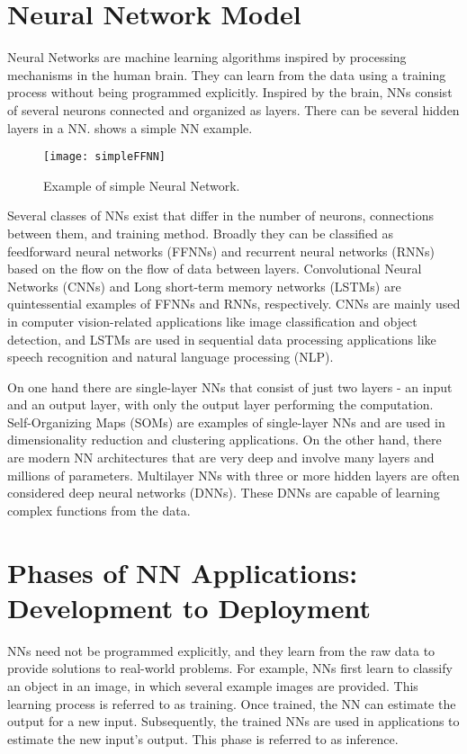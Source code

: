 \section{Neural Network Model}
Neural Networks are machine learning algorithms inspired by processing mechanisms in the human brain. They can learn from the data using a training process without being programmed explicitly. Inspired by the brain, NNs consist of several neurons connected and organized as layers. There can be several hidden layers in a NN.  shows a simple NN example. 
\begin{figure}[!htb]
	\centering
	\captionsetup{font=sf}
	\texttt{[image: simpleFFNN]}
	\caption{Example of simple Neural Network.}
	\label{fig:simpleNN}
\end{figure}

Several classes of NNs exist that differ in the number of neurons, connections between them, and training method. Broadly they can be classified as feedforward neural networks (FFNNs) and recurrent neural networks (RNNs) based on the flow on the flow of data between layers. Convolutional Neural Networks (CNNs) and Long short-term memory networks (LSTMs) are quintessential examples of FFNNs and RNNs, respectively. CNNs are mainly used in computer vision-related applications like image classification and object detection, and LSTMs are used in sequential data processing applications like speech recognition and natural language processing (NLP). 

On one hand there are single-layer NNs that consist of just two layers - an input and an
output layer, with only the output layer performing the computation. Self-Organizing
Maps (SOMs) are examples of single-layer NNs and are used in dimensionality reduction
and clustering applications. On the other hand, there are modern NN architectures that
are very deep and involve many layers and millions of parameters. Multilayer NNs with three or
more hidden layers are often considered deep neural networks (DNNs). These DNNs
are capable of learning complex functions from the data.

\section{Phases of NN Applications: Development to Deployment}
NNs need not be programmed explicitly, and they learn from the raw data to provide solutions to real-world problems. For example, NNs first learn to classify an object in an image, in which several example images are provided. This learning process is referred to as training. Once trained, the NN can estimate the output for a new input. Subsequently, the trained NNs are used in applications to estimate the new input's output. This phase is referred to as inference.

